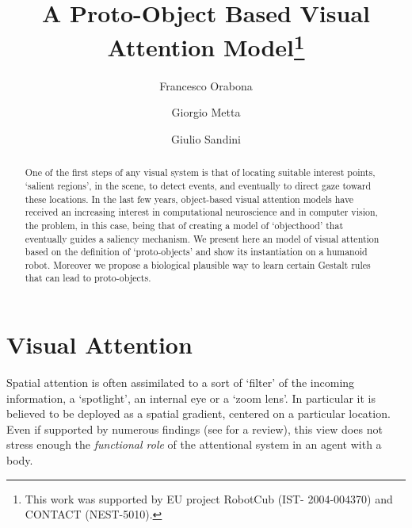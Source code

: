 \documentclass{llncs}
\begin{document}
\mainmatter

\title{A Proto-Object Based Visual Attention Model\thanks{This work was supported by EU project RobotCub (IST-
2004-004370) and CONTACT (NEST-5010).}}

\author{Francesco Orabona \and Giorgio Metta \and Giulio Sandini}


\maketitle

\begin{abstract}
One of the first
steps of any visual system is that of
locating suitable interest points, `salient regions', in
the scene, to detect events, and eventually to direct
gaze toward these locations. In the last few years,
object-based visual attention models have received an
increasing interest in computational neuroscience and
in computer vision, the problem, in
this case, being that of creating a model of
`objecthood' that eventually guides a saliency
mechanism. We present here an model of
visual attention based on the definition of 
`proto-objects' and show its instantiation on a
humanoid robot. Moreover we propose a biological plausible
way to learn certain Gestalt rules that can lead to 
proto-objects.
\end{abstract}

\section{Visual Attention\label{attention}}
Spatial attention is often assimilated to a sort of `filter'
of the incoming information, a `spotlight',
an internal eye or a `zoom lens'. In particular it is
believed to be deployed as a spatial gradient, centered on a particular location.
Even if supported by numerous findings (see \cite{CaveB99} for a review), this view does not
stress enough the \emph{functional role} of the attentional system in an 
agent with a body.
\end{document}
